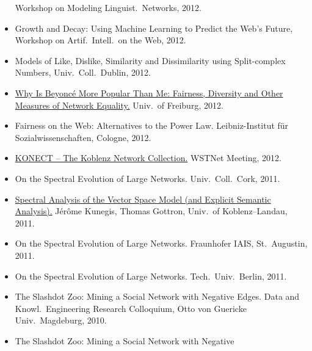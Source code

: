 \documentclass[line,mm]{res}
\newcounter{x}
\newcounter{y}
\newcommand{\talknumber}{T\arabic{y}\stepcounter{y}}
\begin{document}
\begin{resume}
\begin{itemize}
    Workshop on Modeling Linguist.\ Networks, 2012. 
  \item[{[\talknumber]}] Growth and Decay: Using Machine Learning to Predict the Web's
    Future, Workshop on Artif.\ Intell.\ on the Web, 2012. 
  \item[{[\talknumber]}] Models of Like, Dislike, Similarity and Dissimilarity using
    Split-complex Numbers, Univ.\ Coll.\ Dublin, 2012. 
  \item[{[\talknumber]}] 
    \href{https://www.slideshare.net/kunegis/why-beyonc-is-more-popular-than-me-fairness-diversity-and-other-measures}{Why Is Beyoncé More Popular Than Me:  Fairness, Diversity and
    Other Measures of Network Equality.} Univ.\ of Freiburg, 2012. 
  \item[{[\talknumber]}] Fairness on the Web: Alternatives to the Power
    Law. 
    Leibniz-Institut für Sozialwissenschaften, Cologne, 2012.  
  \item[{[\talknumber]}] 
    \href{https://github.com/kunegis/pdfs/blob/master/kunegis:network-survey.presentation.pdf}{KONECT
      -- The Koblenz Network Collection.}  WSTNet Meeting, 2012.  
  \item[{[\talknumber]}] On the Spectral Evolution of Large Networks.  Univ.\ Coll.\ Cork, 2011.   
  \item[{[\talknumber]}] 
    \href{https://github.com/kunegis/pdfs/blob/master/kunegis:explicit-diagonality.presentation.pdf}{Spectral
      Analysis of the Vector Space Model (and Explicit Semantic Analysis).}
    Jérôme Kunegis, Thomas Gottron, Univ.\ of Koblenz--Landau, 2011. 
  \item[{[\talknumber]}] On the Spectral Evolution of Large Networks.  Fraunhofer IAIS,
    St.\ Augustin, 2011.  
  \item[{[\talknumber]}] On the Spectral Evolution of Large Networks. Tech.\ Univ.\ Berlin, 2011.  
  \item[{[\talknumber]}] The Slashdot Zoo: Mining a Social Network with Negative
    Edges. Data and Knowl.\ Engineering Research Colloquium,
    Otto von Guericke Univ.\ Magdeburg, 2010.  
  \item[{[\talknumber]}] The Slashdot Zoo: Mining a Social Network with Negative

\end{itemize}
\end{resume}
\end{document}

